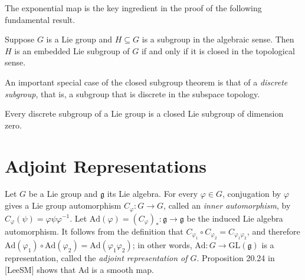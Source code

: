 The exponential map is the key ingredient in the proof of the following fundamental result.

\begin{theorem}
\label{thm:closed-subgroup-theorem}


Suppose $G$ is a Lie group and $H \subseteq G$ is a subgroup in the algebraic sense. Then $H$ is an embedded Lie subgroup of $G$ if and only if it is closed in the topological sense.
\end{theorem}

An important special case of the closed subgroup theorem is that of a \emph{discrete subgroup}, that is, a subgroup that is discrete in the subspace topology.

\begin{proposition}
\label{prop:discrete-subgroups-dimension-zero}


Every discrete subgroup of a Lie group is a closed Lie subgroup of dimension zero.
\end{proposition}

\section{Adjoint Representations}

Let $G$ be a Lie group and $\mathfrak{g}$ its Lie algebra. For every $\varphi \in G$, conjugation by $\varphi$ gives a Lie group automorphism $C_\varphi: G \to G$, called an \emph{inner automorphism}, by $C_\varphi(\psi) = \varphi\psi\varphi^{-1}$. Let $\text{Ad}(\varphi) = (C_\varphi)_*: \mathfrak{g} \to \mathfrak{g}$ be the induced Lie algebra automorphism. It follows from the definition that $C_{\varphi_1} \circ C_{\varphi_2} = C_{\varphi_1\varphi_2}$, and therefore $\text{Ad}(\varphi_1) \circ \text{Ad}(\varphi_2) = \text{Ad}(\varphi_1\varphi_2)$; in other words, $\text{Ad}: G \to \text{GL}(\mathfrak{g})$ is a representation, called the \emph{adjoint representation of $G$}. Proposition 20.24 in [LeeSM] shows that Ad is a smooth map.

